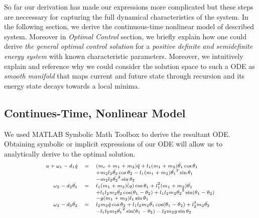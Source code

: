 \documentclass[journal]{IEEEtran}
\begin{document}
So far our derivation has made our expressions more complicated but these steps are
neccessary for capturing the full dynamical characteristics of the system. In the
following section, we derive the continuous-time nonlinear model of described
system. Moreover in \emph{Optimal Control} section, we briefly explain how one
could derive \emph{the general optimal control solution} for a \emph{positive
definite and semidefinite energy system} with known characteristic parameters.
Moreover, we intuitively explain and reference why we could consider the solution
space to such a ODE as \emph{smooth manifold} that maps current and future state
through recursion and its energy state decays towards a local minima.


\subsection{Continues-Time, Nonlinear Model}
We used MATLAB Symbolic Math Toolbox to derive the resultant ODE. Obtaining
symbolic or implicit expressions of our ODE will allow us to analytically derive
to the optimal solution.
\begin{equation}
\text{\scriptsize $
\begin{array}{rcl}
        u + \omega_1 -d_1 \dot{q} &=& (m_c+m_1+m_2)\ddot{q}+l_1(m_1+m_2)\ddot{\theta_1} \cos \theta_1\\
        & & + m_2 l_2 \ddot{\theta_2} \cos \theta_2 - l_1 (m_1+m_2) \dot{\theta_1}^2 \sin \theta_1 \\
        & & - m_2 l_2 \dot{\theta_2}^2 \sin \theta_2\\
        \omega_2 -d_2 \dot{\theta_1} &=& l_1 (m_1+m_2) \ddot(q) \cos \theta_1
        +l_1^2 (m_1+m_2) \ddot{\theta_1}\\
        & & +l_1 l_2 m_2 \ddot{\theta_2} \cos (\theta_1 - \theta_2)+ l_1 l_2 m_2 \dot{\theta_2}^2 \sin(\theta_1 - \theta_2) \\
        & & - g(m_1+m_2) l_1 \sin \theta_1 \\
        \omega_3 -d_3 \dot{\theta_2} &=& l_2 m_2 \ddot{q} \cos \theta_2
        + l_1 l_2 m_2 \ddot{\theta_1} \cos (\theta_1 -\theta_2)
        + l_2^2 m_2 \ddot{\theta_2}\\
        & & -l_1 l_2 m_2 \dot{\theta_1}^2 \sin (\theta_1 - \theta_2)
        - l_2 m_2 g \sin \theta_2\\
    \end{array}
$}
\end{equation}
\end{document}
